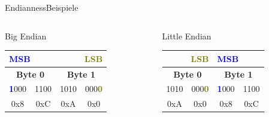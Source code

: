 \documentclass[xelatex,aspectratio=169]{beamer}
\begin{document}
\begin{frame}{Endianness}{Beispiele}
    \begin{columns}
        \begin{column}{0.5\textwidth}
            \begin{exampleblock}{Big Endian}
                \centering
                \begin{tabular}{cccc}
                    \multicolumn{2}{l}{\textcolor{blue}{MSB}} & \multicolumn{2}{r}{\textcolor{olive}{LSB}}                                           \\
                    \toprule
                    \multicolumn{2}{c}{\textbf{Byte 0}}       & \multicolumn{2}{c}{\textbf{Byte 1}}                                                  \\
                    \midrule
                    \textcolor{blue}{\textbf{1}}000           & 1100                                       & 1010 & 000\textcolor{olive}{\textbf{0}} \\
                    0x8                                       & 0xC                                        & 0xA  & 0x0                              \\
                    \bottomrule
                \end{tabular}

            \end{exampleblock}
        \end{column}
        \begin{column}{0.5\textwidth}
            \begin{exampleblock}{Little Endian}
                \centering
                \begin{tabular}{cccc}
                    \multicolumn{2}{r}{\textcolor{olive}{LSB}} & \multicolumn{2}{l}{\textcolor{blue}{MSB}}                                          \\
                    \toprule
                    \multicolumn{2}{c}{\textbf{Byte 0}}        & \multicolumn{2}{c}{\textbf{Byte 1}}                                                \\
                    \midrule
                    1010                                       & 000\textcolor{olive}{\textbf{0}}          & \textcolor{blue}{\textbf{1}}000 & 1100 \\
                    0xA                                        & 0x0                                       & 0x8                             & 0xC  \\
                    \bottomrule
                \end{tabular}
            \end{exampleblock}
        \end{column}
    \end{columns}
\end{frame}
\end{document}
